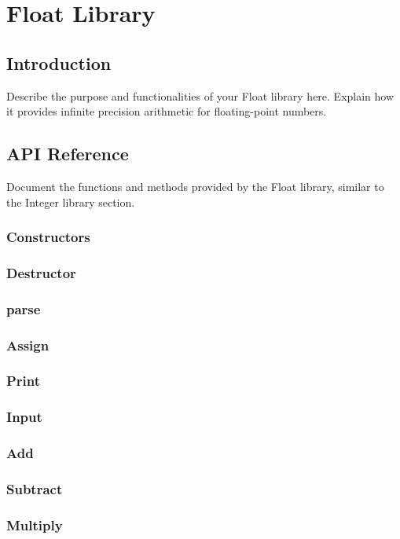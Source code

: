 \section{Float Library}

\subsection{Introduction}

Describe the purpose and functionalities of your Float library here. Explain how it provides infinite precision arithmetic for floating-point numbers. 

\subsection{API Reference}

Document the functions and methods provided by the Float library, similar to the Integer library section.
\subsubsection{Constructors}
\subsubsection{Destructor}
\subsubsection{parse}
\subsubsection{Assign}
\subsubsection{Print}
\subsubsection{Input}
\subsubsection{Add}
\subsubsection{Subtract}
\subsubsection{Multiply}
